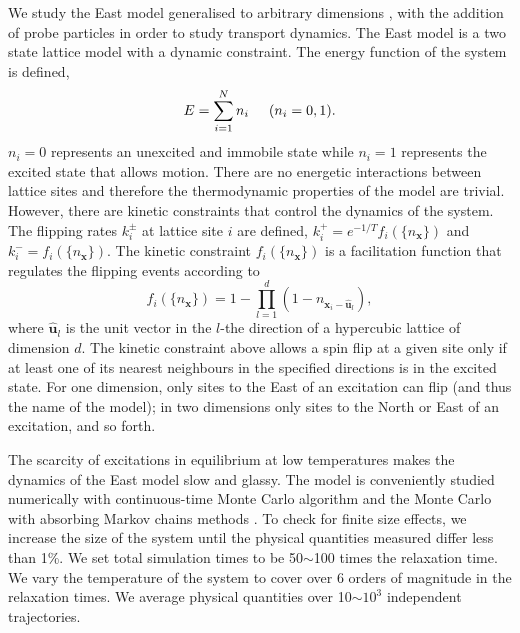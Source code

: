 \documentclass[showpacs,pre,aps,twocolumn,superscriptaddress]{revtex4-1}
\begin{document}
We study the East \cite{Jackle1991,Ritort2003} model generalised to arbitrary dimensions \cite{Ritort2003,Berthier2005,Ashton2005}, with the addition of probe particles \cite{Jung2004,Jung2005} in order to study transport dynamics. 
The East model is a two state lattice model with a dynamic constraint.
The energy function of the system is defined,
\begin{equation}
E=\sum_{i=1}^N n_i \hspace{0.5cm}  (n_i=0,1).
\end{equation}
$n_i=0$ represents an unexcited and immobile state while $n_i=1$ represents the excited state that allows motion.  There are no energetic interactions between  lattice sites and therefore the thermodynamic properties of the model are trivial.
However, there are kinetic constraints that control the dynamics of the system.
The flipping rates $k^{\pm}_{i}$ at lattice site $i$ are defined,
$k^{+}_{i}=e^{-1/T}f_{i}(\{n_{\mathbf{x}}\})$ and $k^{-}_{i}=f_{i}(\{n_{\mathbf{x}}\})$. The kinetic constraint $f_{i}(\{n_{\mathbf{x}}\})$ is a facilitation function that regulates the flipping events according to
\begin{equation}
f_{i}(\{n_{\mathbf{x}}\})=1-\mathop{\prod}^{d}_{l=1}(1-n_{\mathbf{x}_i- \mathbf{\hat{u}}_l}),
\end{equation}
where $\mathbf{\hat{u}}_l$ is the unit vector in 
the $l$-the direction of a hypercubic lattice of dimension $d$.
The kinetic constraint above allows a spin flip at a given site only if at least one of its nearest neighbours in the specified directions is in the excited state.
For one dimension, only sites to the East of an excitation can flip (and thus the name of the model); in two dimensions only sites to the North or East of an excitation, and so forth.

The scarcity of excitations in equilibrium at low temperatures makes the dynamics of the East model slow and glassy.  The model is conveniently studied numerically with continuous-time Monte Carlo algorithm and the Monte Carlo with absorbing Markov chains methods \cite{Bortz1975,Ashton2005}.
To check for finite size effects, we increase the size of the system until the physical quantities measured differ less than 1\%.
We set total simulation times to be 50$\sim$100 times the relaxation time.
We vary the temperature of the system to cover over 6 orders of magnitude in the relaxation times.
We average physical quantities over 10$\sim$$10^3$ independent trajectories.
\end{document}
